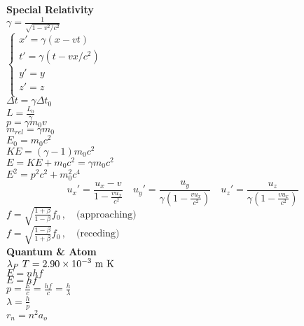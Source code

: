\documentclass[12pt]{article}
\begin{document}
\begin{twocolumn}
\begin{flushleft}
{\bf Special Relativity} \\
\medskip
$\displaystyle \gamma = \frac{1}{\sqrt{1 - v^2/c^2}} $ \\
\medskip
$
\left\{
\begin{array}{l}
x'=\gamma (x- v t) \\
t'=\gamma \left( t- vx/c^2 \right) \\
y'=y\\
z'=z\\
\end{array}
\right.
$ \\
\medskip
$\displaystyle \Delta t =  \gamma \Delta t_0 $ \\
\medskip
$\displaystyle L  = \frac{L_0}{\gamma}$ \\
\medskip
$\displaystyle  p = \gamma m_0 v $ \\
\medskip
$\displaystyle  m_{rel} = \gamma m_0 $ \\
\medskip
$\displaystyle  E_0 = m_0 c^2$ \\
\medskip
$\displaystyle  KE = (\gamma - 1) m_0 c^2$ \\
\medskip
$\displaystyle  E = KE + m_0 c^2 = \gamma m_0 c^2$ \\
\medskip
$\displaystyle  E^2 = p^2c^2 + m_0^2 c^4$ \\
\medskip
\[
u_x'=\frac{u_x-v}{1-\frac{v u_x}{c^2}}
\quad  u_y'=\frac{u_y}{\gamma\left(1-\frac{v u_x}{c^2}\right)}
\quad  u_z'=\frac{u_z}{\gamma\left(1-\frac{v u_x}{c^2}\right)} 
\]
$\displaystyle f=\sqrt{\frac{1+\beta}{1-\beta}} f_0 \, , \quad \textrm{(approaching)} $\\
\medskip
$\displaystyle f=\sqrt{\frac{1-\beta}{1+\beta}} f_0 \, , \quad \textrm{(receding)} $\\
\medskip
{\bf Quantum \& Atom} \\
\medskip
$\displaystyle  \lambda_P~T = 2.90\times 10^{-3}~ \rm m~K$ \\
\medskip
$\displaystyle  E = n h f$ \\
\medskip
$\displaystyle  E = h f$ \\
\medskip
$\displaystyle  p = \frac{E}{c} = \frac{h f}{c} = \frac{h}{\lambda}$ \\
\medskip
$\displaystyle  \lambda = \frac{h}{p}$ \\
\medskip
$\displaystyle  r_n = {n^2} a_o $ \\

\end{flushleft}
\end{twocolumn}
\end{document}
